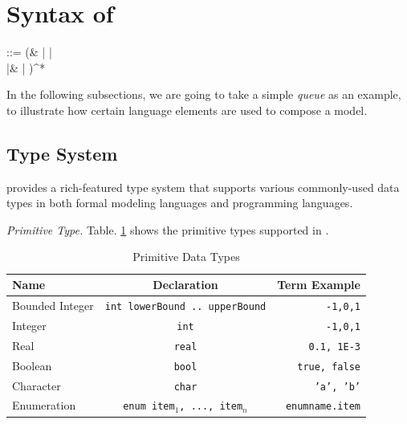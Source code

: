 \section{Syntax of \lang{}}
\label{sec:syntax}

\begin{bnf}
     ::=  (&  |  |  \\
    |&  | )^*
\end{bnf}

In the following subsections, we are going to take a simple \emph{queue} as an example, to illustrate how certain language elements are used to compose a model.

\subsection{Type System}
\label{subsec:typesystem}
\lang{} provides a rich-featured type system that supports various commonly-used data types in both formal modeling languages and programming languages.

\vspace{0.3em}
\noindent\emph{Primitive Type.} Table. \ref{table:primitivetypes} shows the primitive types supported in \lang{}.

\begin{table}
    \caption{Primitive Data Types}
    \label{table:primitivetypes}
    \centering
    \begin{tabular}{lcr}
        \hline
        Name & Declaration & Term Example \T\B \\
        \hline
        \T Bounded Integer\hspace{0.5cm} & \texttt{int lowerBound .. upperBound}\hspace{0.5cm} & \texttt{-1,0,1} \\
        Integer & \texttt{int} & \texttt{-1,0,1} \\
        Real & \texttt{real} & \texttt{0.1, 1E-3} \\
        Boolean & \texttt{bool} & \texttt{true, false} \\
        Character & \texttt{char} & \texttt{'a', 'b'} \\
        \B Enumeration & \texttt{enum {item$_1$, ..., item$_n$}} & \texttt{enumname.item} \\
        \hline
    \end{tabular}
\end{table}

